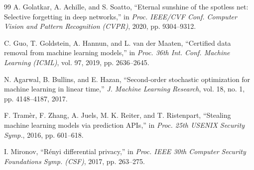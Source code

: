 \documentclass[conference]{IEEEtran}
\begin{document}
\begin{thebibliography}{99}
A. Golatkar, A. Achille, and S. Soatto, ``Eternal sunshine of the spotless net: Selective forgetting in deep networks,'' in \textit{Proc. IEEE/CVF Conf. Computer Vision and Pattern Recognition (CVPR)}, 2020, pp. 9304–9312.

C. Guo, T. Goldstein, A. Hannun, and L. van der Maaten, ``Certified data removal from machine learning models,'' in \textit{Proc. 36th Int. Conf. Machine Learning (ICML)}, vol. 97, 2019, pp. 2636–2645.

N. Agarwal, B. Bullins, and E. Hazan, ``Second-order stochastic optimization for machine learning in linear time,'' \textit{J. Machine Learning Research}, vol. 18, no. 1, pp. 4148–4187, 2017.

F. Tramèr, F. Zhang, A. Juels, M. K. Reiter, and T. Ristenpart, ``Stealing machine learning models via prediction APIs,'' in \textit{Proc. 25th USENIX Security Symp.}, 2016, pp. 601–618.

I. Mironov, ``Rényi differential privacy,'' in \textit{Proc. IEEE 30th Computer Security Foundations Symp. (CSF)}, 2017, pp. 263–275.

\end{thebibliography}
\end{document}
